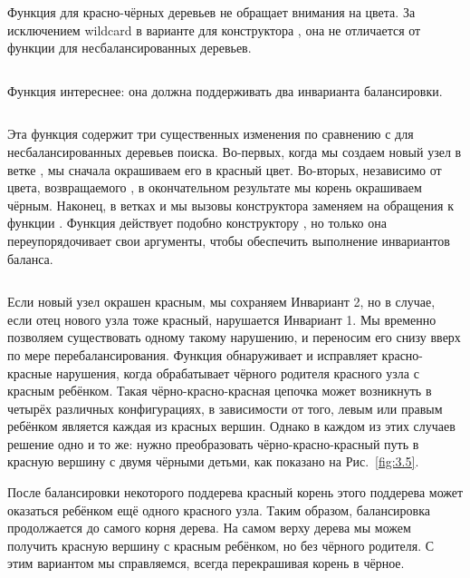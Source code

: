 \begin{frame}[fragile]{}
Функция  для красно-чёрных деревьев не обращает
внимания на цвета. За исключением wildcard в варианте для конструктора
, она не отличается от функции  для
несбалансированных деревьев.
\inputminted[firstline=18,lastline=21] {haskell}{code/RedBlackSet.lhs}
\end{frame}


\begin{frame}[fragile]{}
Функция  интереснее: она должна
поддерживать два инварианта балансировки.

\inputminted[firstline=23,lastline=29] {haskell}{code/RedBlackSet.lhs}

Эта функция содержит три существенных изменения по сравнению с  для
несбалансированных деревьев поиска. Во-первых, когда мы создаем новый
узел в ветке , мы сначала окрашиваем его в красный
цвет. Во-вторых, независимо от цвета, возвращаемого ,
в окончательном результате мы корень окрашиваем чёрным. Наконец, в
ветках  и  мы вызовы конструктора
 заменяем на обращения к функции
. Функция  действует подобно
конструктору , но только она переупорядочивает свои
аргументы, чтобы обеспечить выполнение инвариантов баланса.
\end{frame}


\begin{frame}[fragile]{}
\inputminted[firstline=9,lastline=13] {haskell}{code/RedBlackSet.lhs}

Если новый узел окрашен красным, мы сохраняем Инвариант 2, но в
случае, если отец нового узла тоже красный, нарушается Инвариант 1. Мы
временно позволяем существовать одному такому нарушению, и переносим
его снизу вверх по мере перебалансирования. Функция
 обнаруживает и исправляет красно-красные нарушения,
когда обрабатывает чёрного родителя красного узла с красным
ребёнком. Такая чёрно-красно-красная цепочка может возникнуть в
четырёх различных конфигурациях, в зависимости от того, левым или
правым ребёнком является каждая из красных вершин. Однако в каждом из
этих случаев решение одно и то же: нужно преобразовать
чёрно-красно-красный путь в красную вершину с двумя чёрными детьми,
как показано на Рис.~\ref{fig:3.5}.
\end{frame}


\begin{frame}[fragile]{}
После балансировки некоторого поддерева красный корень этого поддерева
может оказаться ребёнком ещё одного красного узла. Таким образом,
балансировка продолжается до самого корня дерева. На самом верху
дерева мы можем получить красную вершину с красным ребёнком, но без
чёрного родителя. С этим вариантом мы справляемся, всегда перекрашивая корень
в чёрное.

\end{frame}


